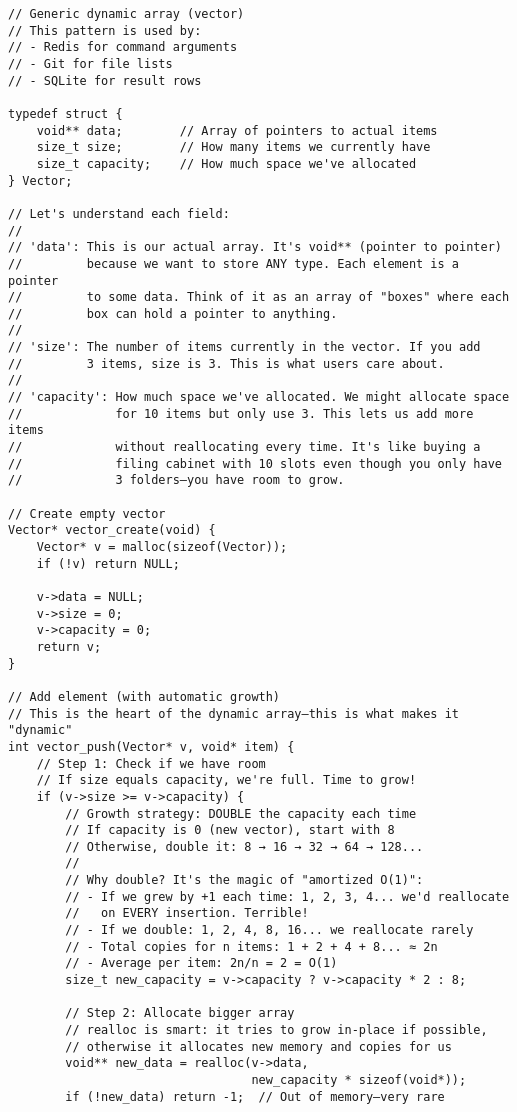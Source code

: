 \begin{lstlisting}
// Generic dynamic array (vector)
// This pattern is used by:
// - Redis for command arguments
// - Git for file lists
// - SQLite for result rows

typedef struct {
    void** data;        // Array of pointers to actual items
    size_t size;        // How many items we currently have
    size_t capacity;    // How much space we've allocated
} Vector;

// Let's understand each field:
//
// 'data': This is our actual array. It's void** (pointer to pointer)
//         because we want to store ANY type. Each element is a pointer
//         to some data. Think of it as an array of "boxes" where each
//         box can hold a pointer to anything.
//
// 'size': The number of items currently in the vector. If you add
//         3 items, size is 3. This is what users care about.
//
// 'capacity': How much space we've allocated. We might allocate space
//             for 10 items but only use 3. This lets us add more items
//             without reallocating every time. It's like buying a
//             filing cabinet with 10 slots even though you only have
//             3 folders—you have room to grow.

// Create empty vector
Vector* vector_create(void) {
    Vector* v = malloc(sizeof(Vector));
    if (!v) return NULL;

    v->data = NULL;
    v->size = 0;
    v->capacity = 0;
    return v;
}

// Add element (with automatic growth)
// This is the heart of the dynamic array—this is what makes it "dynamic"
int vector_push(Vector* v, void* item) {
    // Step 1: Check if we have room
    // If size equals capacity, we're full. Time to grow!
    if (v->size >= v->capacity) {
        // Growth strategy: DOUBLE the capacity each time
        // If capacity is 0 (new vector), start with 8
        // Otherwise, double it: 8 → 16 → 32 → 64 → 128...
        //
        // Why double? It's the magic of "amortized O(1)":
        // - If we grew by +1 each time: 1, 2, 3, 4... we'd reallocate
        //   on EVERY insertion. Terrible!
        // - If we double: 1, 2, 4, 8, 16... we reallocate rarely
        // - Total copies for n items: 1 + 2 + 4 + 8... ≈ 2n
        // - Average per item: 2n/n = 2 = O(1)
        size_t new_capacity = v->capacity ? v->capacity * 2 : 8;

        // Step 2: Allocate bigger array
        // realloc is smart: it tries to grow in-place if possible,
        // otherwise it allocates new memory and copies for us
        void** new_data = realloc(v->data,
                                  new_capacity * sizeof(void*));
        if (!new_data) return -1;  // Out of memory—very rare


\end{lstlisting}
